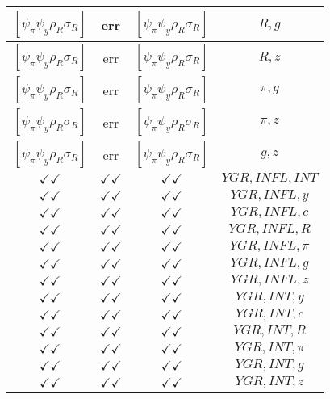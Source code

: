 \documentclass[a4paper,10pt]{article}
\begin{document}
\begin{longtable}{|c|c|c|c|}
\hline
$[\psi_\pi \psi_y \rho_R \sigma_R ]$ & err & $[\psi_\pi \psi_y \rho_R \sigma_R ]$ & ${R},{g}$ \\
\hline
$[\psi_\pi \psi_y \rho_R \sigma_R ]$ & err & $[\psi_\pi \psi_y \rho_R \sigma_R ]$ & ${R},{z}$ \\
\hline
$[\psi_\pi \psi_y \rho_R \sigma_R ]$ & err & $[\psi_\pi \psi_y \rho_R \sigma_R ]$ & ${\pi},{g}$ \\
\hline
$[\psi_\pi \psi_y \rho_R \sigma_R ]$ & err & $[\psi_\pi \psi_y \rho_R \sigma_R ]$ & ${\pi},{z}$ \\
\hline
$[\psi_\pi \psi_y \rho_R \sigma_R ]$ & err & $[\psi_\pi \psi_y \rho_R \sigma_R ]$ & ${g},{z}$ \\
\hline
$\checkmark\checkmark$ & $\checkmark\checkmark$ & $\checkmark\checkmark$ & ${YGR},{INFL},{INT}$ \\
\hline
$\checkmark\checkmark$ & $\checkmark\checkmark$ & $\checkmark\checkmark$ & ${YGR},{INFL},{y}$ \\
\hline
$\checkmark\checkmark$ & $\checkmark\checkmark$ & $\checkmark\checkmark$ & ${YGR},{INFL},{c}$ \\
\hline
$\checkmark\checkmark$ & $\checkmark\checkmark$ & $\checkmark\checkmark$ & ${YGR},{INFL},{R}$ \\
\hline
$\checkmark\checkmark$ & $\checkmark\checkmark$ & $\checkmark\checkmark$ & ${YGR},{INFL},{\pi}$ \\
\hline
$\checkmark\checkmark$ & $\checkmark\checkmark$ & $\checkmark\checkmark$ & ${YGR},{INFL},{g}$ \\
\hline
$\checkmark\checkmark$ & $\checkmark\checkmark$ & $\checkmark\checkmark$ & ${YGR},{INFL},{z}$ \\
\hline
$\checkmark\checkmark$ & $\checkmark\checkmark$ & $\checkmark\checkmark$ & ${YGR},{INT},{y}$ \\
\hline
$\checkmark\checkmark$ & $\checkmark\checkmark$ & $\checkmark\checkmark$ & ${YGR},{INT},{c}$ \\
\hline
$\checkmark\checkmark$ & $\checkmark\checkmark$ & $\checkmark\checkmark$ & ${YGR},{INT},{R}$ \\
\hline
$\checkmark\checkmark$ & $\checkmark\checkmark$ & $\checkmark\checkmark$ & ${YGR},{INT},{\pi}$ \\
\hline
$\checkmark\checkmark$ & $\checkmark\checkmark$ & $\checkmark\checkmark$ & ${YGR},{INT},{g}$ \\
\hline
$\checkmark\checkmark$ & $\checkmark\checkmark$ & $\checkmark\checkmark$ & ${YGR},{INT},{z}$ \\
\hline

\end{longtable}
\end{document}
